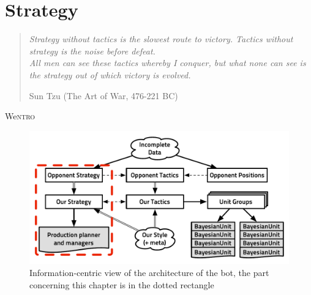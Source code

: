\chapter{Strategy}
\label{chapter:strategy}
\begin{quotation}
\textit{Strategy without tactics is the slowest route to victory. Tactics without strategy is the noise before defeat.}\\
\textit{All men can see these tactics whereby I conquer, but what none can see is the strategy out of which victory is evolved.}\\
\begin{flushright}Sun Tzu (The Art of War, 476-221 BC)\end{flushright}
\end{quotation}

\lettrine{We}{ntro}


\begin{figure}[!ht]
\begin{center}
\includegraphics[width=0.84\columnwidth]{images/starcraft_bbq_concept_STRATEGY.pdf}
\end{center}
\caption{Information-centric view of the architecture of the bot, the part concerning this chapter is in the dotted rectangle}
\label{fig:conceptSTRATEGY}
\end{figure}

